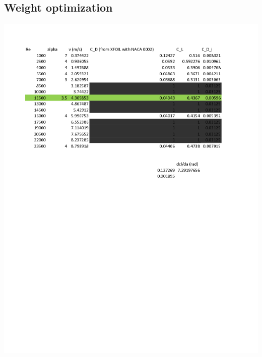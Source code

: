 \documentclass{article}
\begin{document}
\subsection{Weight optimization}
\includegraphics[width = \textwidth]{glider_weight_calculation-0.png}
\end{document}
